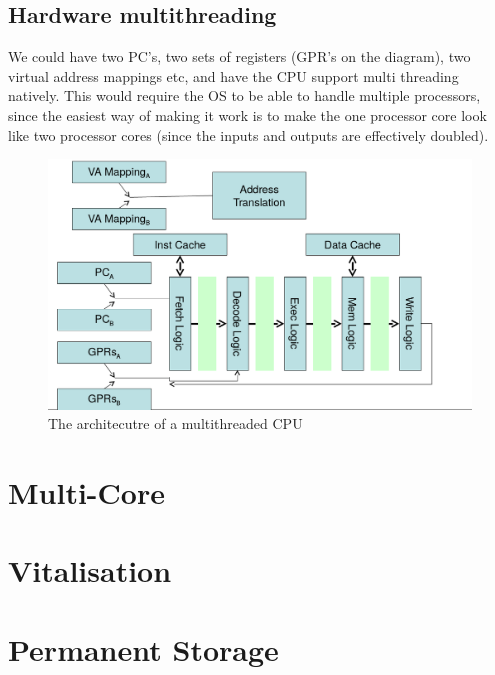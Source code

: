 \subsection{Hardware multithreading}

We could have two PC's, two sets of registers (GPR's on the diagram), two
virtual address mappings etc, and have the CPU support multi threading natively.
This would require the OS to be able to handle multiple processors, since the
easiest way of making it work is to make the one processor core look like two
processor cores (since the inputs and outputs are effectively doubled).

\begin{figure}[H]
  \centering
  \includegraphics[width=\textwidth]{images/hyperthreading}
  \caption{The architecutre of a multithreaded CPU}
  \label{hyperthreading}
\end{figure}

\section{Multi-Core}

\section{Vitalisation}

\section{Permanent Storage}
